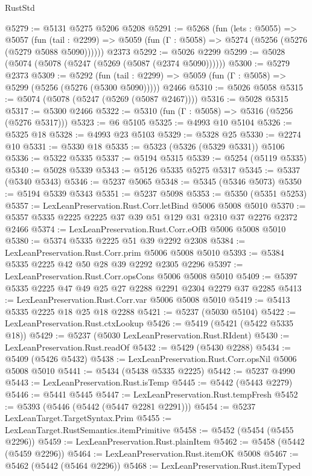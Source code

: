\begin{lexlean}{RustStd}
\begin{coremodule}
@5279 := @5131 @5275 @5206 @5208
@5291 := @5268
    (fun (lets : @5055) =>
    @5057
      (fun (tail : @2299) => @5059 (fun (Γ : @5058) => @5274 (@5256 (@5276 (@5279 @5088 @5090))))))
    @2373
@5292 := @5026 @2299
@5299 := @5028 (@5074 (@5078 (@5247 (@5269 (@5087 (@2374 @5090))))))
@5300 := @5279 @2373
@5309 := @5292
    (fun (tail : @2299) => @5059 (fun (Γ : @5058) => @5299 (@5256 (@5276 (@5300 @5090)))))
    @2466
@5310 := @5026 @5058
@5315 := @5074 (@5078 (@5247 (@5269 (@5087 @2467))))
@5316 := @5028 @5315
@5317 := @5300 @2466
@5322 := @5310 (fun (Γ : @5058) => @5316 (@5256 (@5276 @5317)))
@5323 := @6 @5105
@5325 := @4993 @10 @5104
@5326 := @5325 @18
@5328 := @4993 @23 @5103
@5329 := @5328 @25
@5330 := @2274 @10
@5331 := @5330 @18
@5335 := @5323 (@5326 (@5329 @5331)) @5106
@5336 := @5322 @5335
@5337 := @5194 @5315
@5339 := @5254 (@5119 @5335)
@5340 := @5028 @5339
@5343 := @5126 @5335 @5275 @5317
@5345 := @5337 (@5340 @5343)
@5346 := @5237 @5065
@5348 := @5345 (@5346 @5073)
@5350 := @5194 @5339 @5343
@5351 := @5237 @5098
@5353 := @5350 (@5351 @5253)
@5357 := LexLeanPreservation.Rust.Corr.letBind @5006 @5008 @5010
@5370 := @5357 @5335 @2225 @2225 @37 @39 @51 @129 @31 @2310 @37 @2276 @2372 @2466
@5374 := LexLeanPreservation.Rust.Corr.eOfB @5006 @5008 @5010
@5380 := @5374 @5335 @2225 @51 @39 @2292 @2308
@5384 := LexLeanPreservation.Rust.Corr.prim @5006 @5008 @5010
@5393 := @5384 @5335 @2225 @42 @50 @28 @39 @2292 @2305 @2296
@5397 := LexLeanPreservation.Rust.Corr.opsCons @5006 @5008 @5010
@5409 := @5397 @5335 @2225 @47 @49 @25 @27 @2288 @2291 @2304 @2279 @37 @2285
@5413 := LexLeanPreservation.Rust.Corr.var @5006 @5008 @5010
@5419 := @5413 @5335 @2225 @18 @25 @18 @2288
@5421 := @5237 (@5030 @5104)
@5422 := LexLeanPreservation.Rust.ctxLookup
@5426 := @5419 (@5421 (@5422 @5335 @18))
@5429 := @5237 (@5030 LexLeanPreservation.Rust.RIdent)
@5430 := LexLeanPreservation.Rust.readOf
@5432 := @5429 (@5430 @2288)
@5434 := @5409 (@5426 @5432)
@5438 := LexLeanPreservation.Rust.Corr.opsNil @5006 @5008 @5010
@5441 := @5434 (@5438 @5335 @2225)
@5442 := @5237 @4990
@5443 := LexLeanPreservation.Rust.isTemp
@5445 := @5442 (@5443 @2279)
@5446 := @5441 @5445
@5447 := LexLeanPreservation.Rust.tempFresh
@5452 := @5393 (@5446 (@5442 (@5447 @2281 @2291)))
@5454 := @5237 LexLeanTarget.TargetSyntax.Prim
@5455 := LexLeanTarget.RustSemantics.itemPrimitive
@5458 := @5452 (@5454 (@5455 @2296))
@5459 := LexLeanPreservation.Rust.plainItem
@5462 := @5458 (@5442 (@5459 @2296))
@5464 := LexLeanPreservation.Rust.itemOK @5008
@5467 := @5462 (@5442 (@5464 @2296))
@5468 := LexLeanPreservation.Rust.itemTyped

\end{coremodule}
\end{lexlean}
